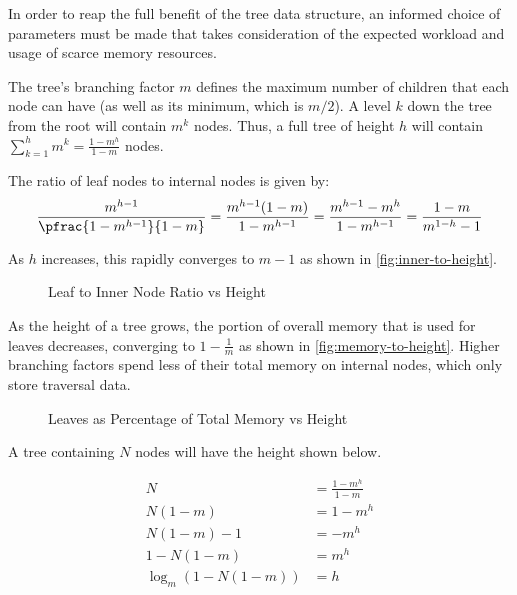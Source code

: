 \label{subsec:system-architecture}

\label{subsec:tree-parameters}


In order to reap the full benefit of the tree data structure, an informed choice
of parameters must be made that takes consideration of the expected workload and
usage of scarce memory resources.

The tree's branching factor $m$ defines the maximum number of children that each
node can have (as well as its minimum, which is $m/2$). A level $k$ down the
tree from the root will contain $m^k$ nodes. Thus, a full tree of height $h$
will contain $\sum_{k=1}^h m^k = \frac{1-m^h}{1-m}$ nodes.

The ratio of leaf nodes to internal nodes is given by:
$$
	\frac{m^{h-1}}{\pfrac{1-m^{h-1}}{1-m}}
	= \frac{m^{h-1}(1-m)}{1-m^{h-1}}
	= \frac{m^{h-1}-m^{h}}{1-m^{h-1}}
	= \frac{1-m}{m^{1-h} - 1}
$$

As $h$ increases, this rapidly converges to $m-1$ as shown in
\autoref{fig:inner-to-height}.

\begin{figure}[h]
	\centering
	
	\caption{Leaf to Inner Node Ratio vs Height}
	\label{fig:inner-to-height}
\end{figure}

As the height of a tree grows, the portion of overall memory that is used for
leaves decreases, converging to $1-\frac{1}{m}$ as shown in
\autoref{fig:memory-to-height}. Higher branching factors spend less of their
total memory on internal nodes, which only store traversal data.

\begin{figure}[H]
	\centering
	
	\caption{Leaves as Percentage of Total Memory vs Height}
	\label{fig:memory-to-height}
\end{figure}

A tree containing $N$ nodes will have the height shown below.

\begin{align*}
	N &= \frac{1-m^h}{1-m} \\
	N (1-m) &= 1-m^h \\
	N (1-m) - 1 &= -m^h \\
	1 - N (1-m) &= m^h \\
	\log_m\left(1 - N (1-m)\right) &= h
\end{align*}


